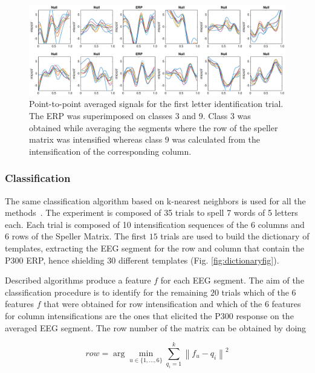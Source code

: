 \documentclass[brainsci,article,submit,moreauthors,pdftex,10pt,a4paper]{mdpi}
\begin{document}
\begin{figure}[H]
\centering
\includegraphics[width=1.0\linewidth]{images/GainCheck.eps}
\caption{Point-to-point averaged signals for the first letter identification trial.  The ERP was superimposed on classes 3 and 9.  Class 3 was obtained while averaging the segments where the row of the speller matrix was intensified whereas class 9 was calculated from the intensification of the corresponding column.}
\label{fig:gaincheck}
\end{figure}


\subsubsection{Classification} \label{section:classification}

The same classification algorithm based on k-nearest neighbors is used for all the methods~\citep{Boiman2008}.   The experiment is composed of 35 trials to spell 7 words of 5 letters each.  Each trial is composed of 10 intensification sequences of the 6 columns and 6 rows of the Speller Matrix.  The first $15$ trials are used to build the dictionary of templates, extracting the EEG segment for the row and column that contain the P300 ERP, hence shielding $30$ different templates (Fig. \ref{fig:dictionaryfig}).

Described algorithms produce a feature $f$ for each EEG segment.  The aim of the classification procedure is to identify for the remaining $20$ trials which of the 6 features $f$ that were obtained for row intensification and which of the 6 features for column intensifications are the ones that elicited the P300 response on the averaged EEG segment. The row number of the matrix can be obtained by doing

\begin{equation}
\hat{row} = \arg \min_{u \in \{1,\dots,6\}} \sum_{q_i=1}^{k} \left\lVert f_u - q_i \right\rVert ^2
\label{eq:multiclassificationrow}
\end{equation}
\end{document}
